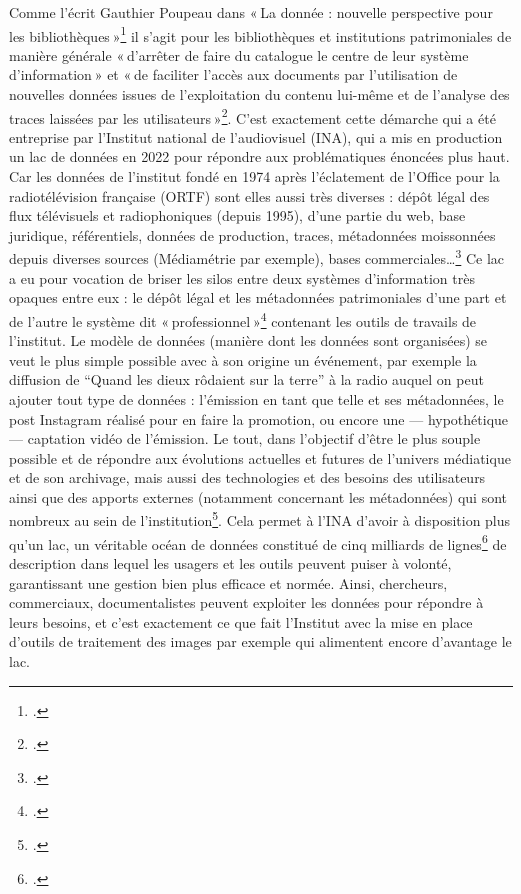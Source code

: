 Comme l’écrit Gauthier Poupeau dans « La donnée : nouvelle perspective pour les bibliothèques »\footcite{poupeau_donnee_2016} il s’agit pour les bibliothèques et institutions patrimoniales de manière générale « d’arrêter de faire du catalogue le centre de leur système d’information » et « de faciliter l’accès aux documents par l’utilisation de nouvelles données issues de l’exploitation du contenu lui-même et de l’analyse des traces laissées par les utilisateurs »\footcite[§ 3]{poupeau_donnee_2016}. C’est exactement cette démarche qui a été entreprise par l’Institut national de l’audiovisuel (INA), qui a mis en production un lac de données en 2022 pour répondre aux problématiques énoncées plus haut. Car les données de l’institut fondé en 1974 après l’éclatement de l’Office pour la radiotélévision française (ORTF) sont elles aussi très diverses : dépôt légal des flux télévisuels et radiophoniques (depuis 1995), d’une partie du web, base juridique, référentiels, données de production, traces, métadonnées moissonnées depuis diverses sources (Médiamétrie par exemple), bases commerciales…\footcite{alquier2024} Ce lac a eu pour vocation de briser les silos entre deux systèmes d’information très opaques entre eux : le dépôt légal et les métadonnées patrimoniales d’une part et de l’autre le système dit « professionnel »\footcite[p. 195]{dribault_dujardin_levolution_2020} contenant les outils de travails de l'institut. Le modèle de données (manière dont les données sont organisées) se veut le plus simple possible avec à son origine un événement, par exemple la diffusion de \enquote{Quand les dieux rôdaient sur la terre} à la radio auquel on peut ajouter tout type de données : l’émission en tant que telle et ses métadonnées, le post Instagram réalisé pour en faire la promotion, ou encore une — hypothétique — captation vidéo de l’émission. Le tout, dans l’objectif d’être le plus souple possible et de répondre aux évolutions actuelles et futures de l’univers médiatique et de son archivage, mais aussi des technologies et des besoins des utilisateurs ainsi que des apports externes (notamment concernant les métadonnées) qui sont nombreux au sein de l’institution\footcite[p. 198]{dribault_dujardin_levolution_2020}. Cela permet à l’INA d’avoir à disposition plus qu’un lac, un véritable océan de données constitué de cinq milliards de lignes\footcite{alquier2024} de description dans lequel les usagers et les outils peuvent puiser à volonté, garantissant une gestion bien plus efficace et normée. Ainsi, chercheurs, commerciaux, documentalistes peuvent exploiter les données pour répondre à leurs besoins, et c’est exactement ce que fait l’Institut avec la mise en place d’outils de traitement des images par exemple qui alimentent encore d'avantage le lac.


